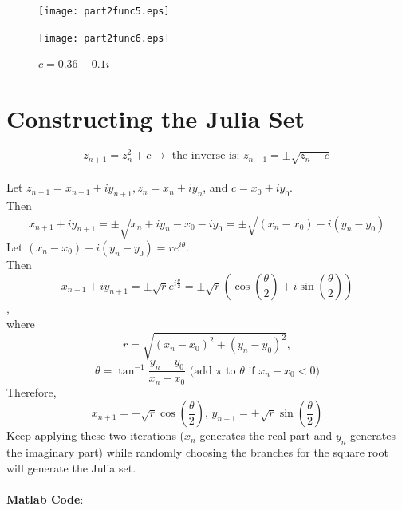 \documentclass{article}
\begin{document}
   \begin{figure}[!h]
  \begin{minipage}[b]{0.45\textwidth}
    \texttt{[image: part2func5.eps]}
    \caption{$c = -1$}
  \end{minipage}
  \hfill
  \begin{minipage}[b]{0.45\textwidth}
    \texttt{[image: part2func6.eps]}
    \caption{$c = 0.36 - 0.1i$}
  \end{minipage}

\end{figure}

\section{Constructing the Julia Set}
$$z_{n+1} = z_n^2 +c\rightarrow \textrm{ the inverse is: }z_{n+1} = \pm\sqrt{z_{n}-c}$$\\
Let $z_{n+1} = x_{n+1} + iy_{n+1}, z_n = x_n + iy_n$, and $c = x_0 + iy_0$.\\
Then $$x_{n+1}+iy_{n+1} = \pm\sqrt{x_n+iy_n-x_0-iy_0} = \pm\sqrt{(x_n-x_0)-i(y_n-y_0)} $$
Let $(x_n-x_0)-i(y_n-y_0) = re^{i\theta}$.\\
Then $$x_{n+1}+iy_{n+1} =\pm \sqrt{r}e^{i\frac{\theta}{2}} = \pm\sqrt{r}(\cos(\frac{\theta}{2})+i\sin(\frac{\theta}{2}))$$,\\
where $$r = \sqrt{(x_n-x_0)^2 + (y_n-y_0)^2},$$$$ \theta = \tan^{-1}{\frac{y_n-y_0}{x_n-x_0}}\textrm{  (add $\pi$ to $\theta$ if $x_n-x_0 < 0$)}$$
Therefore, $$x_{n+1} = \pm\sqrt{r}\cos(\frac{\theta}{2}) \textrm{, }y_{n+1} = \pm\sqrt{r}\sin(\frac{\theta}{2})$$
Keep applying these two iterations ($x_n$ generates the real part and $y_n$ generates the imaginary part) while randomly choosing the branches for the square root will generate the Julia set.\\
\\
\textbf{Matlab Code}:
\end{document}
